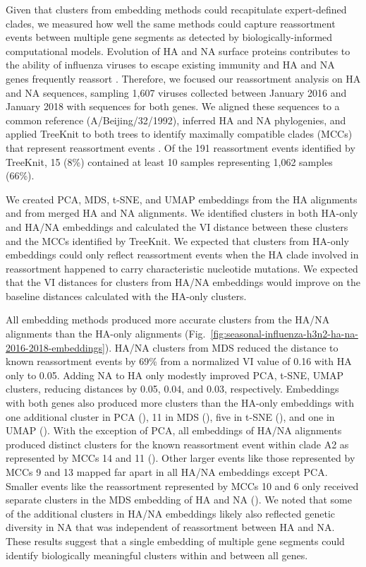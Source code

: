 \documentclass[10pt,letterpaper]{article}
\begin{document}
Given that clusters from embedding methods could recapitulate expert-defined clades, we measured how well the same methods could capture reassortment events between multiple gene segments as detected by biologically-informed computational models.
Evolution of HA and NA surface proteins contributes to the ability of influenza viruses to escape existing immunity \cite{Petrova2018} and HA and NA genes frequently reassort \cite{Nelson2008,Marshall2013,Potter2019}.
Therefore, we focused our reassortment analysis on HA and NA sequences, sampling 1,607 viruses collected between January 2016 and January 2018 with sequences for both genes.
We aligned these sequences to a common reference (A/Beijing/32/1992), inferred HA and NA phylogenies, and applied TreeKnit to both trees to identify maximally compatible clades (MCCs) that represent reassortment events \cite{Barrat-Charlaix2022}.
Of the 191 reassortment events identified by TreeKnit, 15 (8\%) contained at least 10 samples representing 1,062 samples (66\%).

We created PCA, MDS, t-SNE, and UMAP embeddings from the HA alignments and from merged HA and NA alignments.
We identified clusters in both HA-only and HA/NA embeddings and calculated the VI distance between these clusters and the MCCs identified by TreeKnit.
We expected that clusters from HA-only embeddings could only reflect reassortment events when the HA clade involved in reassortment happened to carry characteristic nucleotide mutations.
We expected that the VI distances for clusters from HA/NA embeddings would improve on the baseline distances calculated with the HA-only clusters.

All embedding methods produced more accurate clusters from the HA/NA alignments than the HA-only alignments (Fig.~\ref{fig:seasonal-influenza-h3n2-ha-na-2016-2018-embeddings}).
HA/NA clusters from MDS reduced the distance to known reassortment events by 69\% from a normalized VI value of 0.16 with HA only to 0.05.
Adding NA to HA only modestly improved PCA, t-SNE, UMAP clusters, reducing distances by 0.05, 0.04, and 0.03, respectively.
Embeddings with both genes also produced more clusters than the HA-only embeddings with one additional cluster in PCA (), 11 in MDS (), five in t-SNE (), and one in UMAP ().
With the exception of PCA, all embeddings of HA/NA alignments produced distinct clusters for the known reassortment event within clade A2 \cite{Potter2019} as represented by MCCs 14 and 11 ().
Other larger events like those represented by MCCs 9 and 13 mapped far apart in all HA/NA embeddings except PCA.
Smaller events like the reassortment represented by MCCs 10 and 6 only received separate clusters in the MDS embedding of HA and NA ().
We noted that some of the additional clusters in HA/NA embeddings likely also reflected genetic diversity in NA that was independent of reassortment between HA and NA.
These results suggest that a single embedding of multiple gene segments could identify biologically meaningful clusters within and between all genes.
\end{document}
